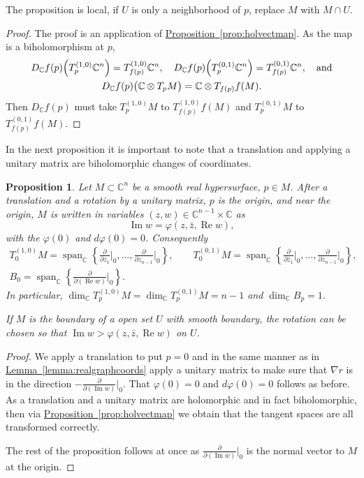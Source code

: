 \documentclass[12pt,openany]{book}
\renewcommand{\Re}{\operatorname{Re}}
\renewcommand{\Im}{\operatorname{Im}}
\newcommand{\C}{{\mathbb{C}}}
\theoremstyle{plain}
\newtheorem{prop}[thm]{Proposition}
\theoremstyle{remark}
\theoremstyle{definition}
\theoremstyle{exercise}
\theoremstyle{example}
\newcommand{\propref}[1]{\hyperref[#1]{Proposition~\ref*{#1}}}
\newcommand{\lemmaref}[1]{\hyperref[#1]{Lemma~\ref*{#1}}}
\begin{document}
The proposition is local, if $U$ is only a neighborhood of $p$,
replace $M$ with $M \cap U$.

\begin{proof}
The proof is an application of \propref{prop:holvectmap}.
As the map is a biholomorphism at $p$,
\begin{multline*}
D_\C f(p)\Bigl(T_p^{(1,0)}\C^n\Bigr) = T_{f(p)}^{(1,0)}\C^n, \quad 
D_\C f(p)\Bigl(T_p^{(0,1)}\C^n\Bigr) = T_{f(p)}^{(0,1)}\C^n, \quad
\text{and} \\
D_\C f(p)\bigl(\C \otimes T_pM\bigr) =\C \otimes  T_{f(p)}f(M) .
\end{multline*}
Then $D_\C f(p)$ must take
$T_p^{(1,0)}M$ to $T_{f(p)}^{(1,0)}f(M)$ and
$T_p^{(0,1)}M$ to $T_{f(p)}^{(0,1)}f(M)$.
\end{proof}

In the next proposition it is important to note that a translation and
applying a unitary matrix are biholomorphic changes of coordinates.

\begin{prop} \label{prop:graphcoordinatesCn}
\pagebreak[2]
Let $M \subset \C^n$ be a smooth real hypersurface, $p \in M$.
After a translation and a rotation by a unitary
matrix, $p$ is the origin, and near the origin,
$M$ is written in variables $(z,w) \in \C^{n-1}
\times \C$ as
\begin{equation*}
\Im w = \varphi(z,\bar{z},\Re w) ,
\end{equation*}
with the $\varphi(0)$  and $d\varphi(0) = 0$.  Consequently
\begin{gather*}
T_0^{(1,0)} M
= \operatorname{span}_{\C} \left\{
\frac{\partial}{\partial z_1}\Big|_0,
\ldots,
\frac{\partial}{\partial z_{n-1}}\Big|_0 \right\} ,
\qquad
T_0^{(0,1)} M
= \operatorname{span}_{\C} \left\{
\frac{\partial}{\partial \bar{z}_1}\Big|_0,
\ldots,
\frac{\partial}{\partial \bar{z}_{n-1}}\Big|_0 \right\} ,
\\
B_0 = \operatorname{span}_{\C} \left\{
\frac{\partial}{\partial (\Re w)}\Big|_0 \right\} .
\end{gather*}
In particular,
$\dim_\C T_p^{(1,0)} M = \dim_\C T_p^{(0,1)} M = n-1$ and 
$\dim_\C B_p = 1$.

If $M$ is the boundary of a open set $U$ with smooth boundary,
the rotation can be chosen so that
$\Im w > \varphi(z,\bar{z},\Re w)$ on $U$.
\pagebreak[2]
\end{prop}

\begin{proof}
We apply a translation to put $p=0$ and in the
same manner as in \lemmaref{lemma:realgraphcoords}
apply a unitary matrix to make sure that $\nabla r$ is
in the direction
$-\frac{\partial}{\partial (\Im w)}\big|_0$.  That $\varphi(0) = 0$
and $d\varphi(0) = 0$ follows as before.
As a translation and a unitary matrix are holomorphic
and in fact biholomorphic, then
via \propref{prop:holvectmap} we obtain that the tangent spaces are all
transformed correctly.

The rest of the proposition follows at once as
$\frac{\partial}{\partial (\Im w)}\big|_0$ is the normal vector to $M$
at the origin.
\end{proof}
\end{document}
